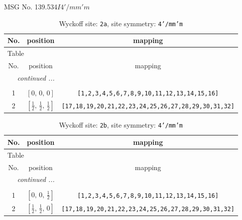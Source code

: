 \documentclass[fleqn,8pt]{jsarticle}
\begin{document}
\setcounter{MaxMatrixCols}{32}

\renewcommand{\tablename}{Table~}
\renewcommand{\figurename}{Figure~}
\begin{center}
\LARGE
MSG No. 139.534\quad$I4'/mm'm$
\end{center}
\renewcommand{\arraystretch}{1.2}
\begin{longtable}{ccc}
\caption{Wyckoff site: {\tt 2a}, site symmetry: {\tt 4'/mm'm}}
 \\
 \hline \hline
No. & position & mapping \\ \hline \endfirsthead

\multicolumn{2}{l}{\tablename\ \thetable{}} \\
 \hline \hline
No. & position & mapping \\ \hline \endhead

 \hline \hline
\multicolumn{2}{r}{\footnotesize\it continued ...} \\ \endfoot

 \hline \hline
\multicolumn{2}{r}{} \\ \endlastfoot

1 & $\left[ 0,\, 0,\, 0 \right]$ & {\tt [1,2,3,4,5,6,7,8,9,10,11,12,13,14,15,16]} \\ \hline
2 & $\left[ \frac{1}{2},\, \frac{1}{2},\, \frac{1}{2} \right]$ & {\tt [17,18,19,20,21,22,23,24,25,26,27,28,29,30,31,32]} \\
\end{longtable}
\renewcommand{\arraystretch}{1.2}
\begin{longtable}{ccc}
\caption{Wyckoff site: {\tt 2b}, site symmetry: {\tt 4'/mm'm}}
 \\
 \hline \hline
No. & position & mapping \\ \hline \endfirsthead

\multicolumn{2}{l}{\tablename\ \thetable{}} \\
 \hline \hline
No. & position & mapping \\ \hline \endhead

 \hline \hline
\multicolumn{2}{r}{\footnotesize\it continued ...} \\ \endfoot

 \hline \hline
\multicolumn{2}{r}{} \\ \endlastfoot

1 & $\left[ 0,\, 0,\, \frac{1}{2} \right]$ & {\tt [1,2,3,4,5,6,7,8,9,10,11,12,13,14,15,16]} \\ \hline
2 & $\left[ \frac{1}{2},\, \frac{1}{2},\, 0 \right]$ & {\tt [17,18,19,20,21,22,23,24,25,26,27,28,29,30,31,32]} \\
\end{longtable}
\end{document}
